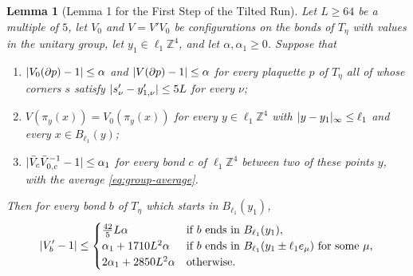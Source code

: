 \documentclass[11pt]{preprint}
\DeclarePairedDelimiter{\abs}{\lvert}{\rvert}
\numberwithin{equation}{section}
\newtheorem{lemma}[theorem]{Lemma}
\theoremstyle{definition}
\theoremstyle{remark}
\theoremstyle{plain}
\begin{document}
\begin{lemma}[Lemma 1 for the First Step of the Tilted Run]\label{lem:reg-lemma-one}
Let $L \geq 64$ be a multiple of $5$, let $V_0$ and $V = V'V_0$ be configurations on the bonds of $T_\eta$ with values in the unitary group, let $y_1 \in \ell_1\mathbb Z^4$, and let $\alpha, \alpha_1 \geq 0$. Suppose that
\begin{enumerate}[label=(\alph*)]
\item $\abs{V_0(\partial p) - 1} \leq \alpha$ and $\abs{V(\partial p) - 1} \leq \alpha$ for every plaquette $p$ of $T_\eta$ all of whose corners $s$ satisfy $\abs{s'_\nu - y'_{1,\nu}} \leq 5L$ for every $\nu$;
\item $V(\pi_y(x)) = V_0(\pi_y(x))$ for every $y \in \ell_1\mathbb Z^4$ with $\abs{y - y_1}_\infty \leq \ell_1$ and every $x \in B_{\ell_1}(y)$;
\item $\abs{\bar V_c\bar V_{0,c}^{-1} - 1} \leq \alpha_1$ for every bond $c$ of $\ell_1\mathbb Z^4$ between two of these points $y$, with the average \eqref{eq:group-average}.
\end{enumerate}
Then for every bond $b$ of $T_\eta$ which starts in $B_{\ell_1}(y_1)$,
\begin{equation}\label{eq:reg-lemma-one}
    \abs{V'_b - 1} \leq
    \begin{cases}
        \tfrac{42}{5}L\alpha & \text{if $b$ ends in $B_{\ell_1}(y_1)$,}\\
        \alpha_1 + 1710L^2\alpha & \text{if $b$ ends in $B_{\ell_1}(y_1 \pm \ell_1e_\mu)$ for some $\mu$,}\\
        2\alpha_1 + 2850L^2\alpha & \text{otherwise.}
    \end{cases}
\end{equation}
\end{lemma}
\end{document}
